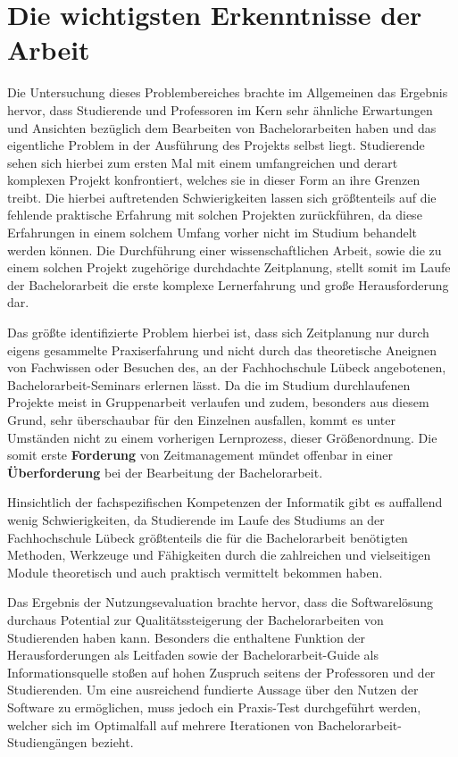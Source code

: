\documentclass[bibliography=totoc,listof=totoc,BCOR=5mm,DIV=12,oneside]{scrbook}
\begin{document}
\section{Die wichtigsten Erkenntnisse der Arbeit}
Die Untersuchung dieses Problembereiches brachte im Allgemeinen das Ergebnis hervor, dass Studierende und Professoren im Kern sehr ähnliche Erwartungen und Ansichten bezüglich dem Bearbeiten von Bachelorarbeiten haben und das eigentliche Problem in der Ausführung des Projekts selbst liegt. Studierende sehen sich hierbei zum ersten Mal mit einem umfangreichen und derart komplexen Projekt konfrontiert, welches sie in dieser Form an ihre Grenzen treibt. Die hierbei auftretenden Schwierigkeiten lassen sich größtenteils auf die fehlende praktische Erfahrung mit solchen Projekten zurückführen, da diese Erfahrungen in einem solchem Umfang vorher nicht im Studium behandelt werden können. Die Durchführung einer wissenschaftlichen Arbeit, sowie die zu einem solchen Projekt zugehörige durchdachte Zeitplanung, stellt somit im Laufe der Bachelorarbeit die erste komplexe Lernerfahrung und große Herausforderung dar.

\par \bigskip Das größte identifizierte Problem hierbei ist, dass sich Zeitplanung nur durch eigens gesammelte Praxiserfahrung und nicht durch das theoretische Aneignen von Fachwissen oder Besuchen des, an der Fachhochschule Lübeck angebotenen, Bachelorarbeit-Seminars erlernen lässt. Da die im Studium durchlaufenen Projekte meist in Gruppenarbeit verlaufen und zudem, besonders aus diesem Grund, sehr überschaubar für den Einzelnen ausfallen, kommt es unter Umständen nicht zu einem vorherigen Lernprozess, dieser Größenordnung. Die somit erste \textbf{Forderung} von Zeitmanagement mündet offenbar in einer \textbf{Überforderung} bei der Bearbeitung der Bachelorarbeit.
\par \bigskip Hinsichtlich der fachspezifischen Kompetenzen der Informatik gibt es auffallend wenig Schwierigkeiten, da Studierende im Laufe des Studiums an der Fachhochschule Lübeck größtenteils die für die Bachelorarbeit benötigten Methoden, Werkzeuge und Fähigkeiten durch die zahlreichen und vielseitigen Module theoretisch und auch praktisch vermittelt bekommen haben.

\par \bigskip Das Ergebnis der Nutzungsevaluation brachte hervor, dass die Softwarelösung durchaus Potential zur Qualitätssteigerung der Bachelorarbeiten von Studierenden haben kann. Besonders die enthaltene Funktion der Herausforderungen als Leitfaden sowie der Bachelorarbeit-Guide als Informationsquelle stoßen auf hohen Zuspruch seitens der Professoren und der Studierenden. Um eine ausreichend fundierte Aussage über den Nutzen der Software zu ermöglichen, muss jedoch ein Praxis-Test durchgeführt werden, welcher sich im Optimalfall auf mehrere Iterationen von Bachelorarbeit-Studiengängen bezieht.
\end{document}
